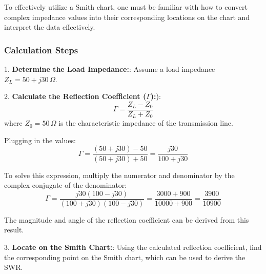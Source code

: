 To effectively utilize a Smith chart, one must be familiar with how to convert complex impedance values into their corresponding locations on the chart and interpret the data effectively.

\subsubsection{Calculation Steps}

1. \textbf{Determine the Load Impedance:}: Assume a load impedance \( Z_L = 50 + j30 \, \Omega \).

2. \textbf{Calculate the Reflection Coefficient (\( \Gamma \)):}): 
   \[
   \Gamma = \frac{Z_L - Z_0}{Z_L + Z_0}
   \]
   where \( Z_0 = 50 \, \Omega \) is the characteristic impedance of the transmission line.

   Plugging in the values:
   \[
   \Gamma = \frac{(50 + j30) - 50}{(50 + j30) + 50} = \frac{j30}{100 + j30}
   \]

   To solve this expression, multiply the numerator and denominator by the complex conjugate of the denominator:
   \[
   \Gamma = \frac{j30(100 - j30)}{(100 + j30)(100 - j30)} = \frac{3000 + 900}{10000 + 900} = \frac{3900}{10900}
   \]

   The magnitude and angle of the reflection coefficient can be derived from this result.

3. \textbf{Locate on the Smith Chart:}: Using the calculated reflection coefficient, find the corresponding point on the Smith chart, which can be used to derive the SWR.

\begin{center}
\end{center}
